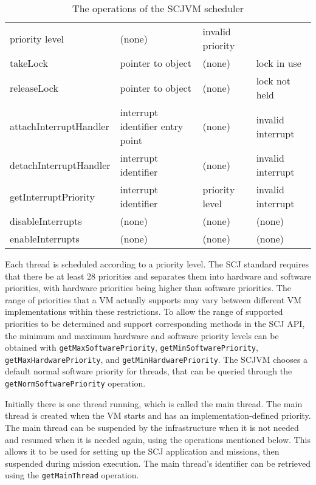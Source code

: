\documentclass[a4paper,10pt]{article}
\begin{document}
\begin{table}[ht]
\begin{tabular}{|l|p{3cm}|p{2.2cm}|p{2.7cm}|}
      priority level &
      (none) &
      invalid priority
    \\takeLock &
      pointer to object &
      (none) &
      lock in use
    \\releaseLock &
      pointer to object &
      (none) &
      lock not held
    \\attachInterruptHandler &
      interrupt identifier \newline
      entry point &
      (none) &
      invalid interrupt
    \\detachInterruptHandler &
      interrupt identifier &
      (none) &
      invalid interrupt
    \\getInterruptPriority &
      interrupt identifier &
      priority level &
      invalid interrupt
    \\disableInterrupts &
      (none) &
      (none) &
      (none)
    \\enableInterrupts &
      (none) &
      (none) &
      (none)
  \end{tabular}
  \caption{The operations of the SCJVM scheduler}
  \label{scheduler-table}
\end{table}

Each thread is scheduled according to a priority level. The SCJ standard
requires that there be at least 28 priorities and separates them into hardware
and software priorities, with hardware priorities being higher than software
priorities. The range of priorities that a VM actually supports may vary between
different VM implementations within these restrictions. To allow the range of
supported priorities to be determined and support corresponding methods in the
SCJ API, the minimum and maximum hardware and software priority levels can be
obtained with \texttt{get\-Max\-Soft\-ware\-Pri\-or\-ity},
\texttt{get\-Min\-Soft\-ware\-Pri\-or\-ity},
\texttt{get\-Max\-Hard\-ware\-Pri\-or\-ity}, and
\texttt{get\-Min\-Hard\-ware\-Pri\-or\-ity}. The SCJVM chooses a default normal
software priority for threads, that can be queried through the
\texttt{get\-Norm\-Soft\-ware\-Pri\-or\-ity} operation.

Initially there is one thread running, which is called the main thread. The main
thread is created when the VM starts and has an implementation-defined
priority. The main thread can be suspended by the infrastructure when it is not
needed and resumed when it is needed again, using the operations mentioned
below. This allows it to be used for setting up the SCJ application and
missions, then suspended during mission execution. The main thread's identifier
can be retrieved using the \texttt{get\-Main\-Thread} operation.
\end{document}
